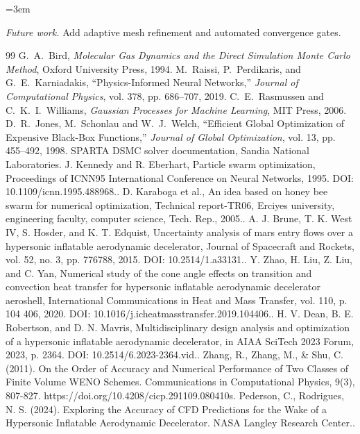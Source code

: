 \documentclass[conference]{IEEEtran}
\begin{document}
\begin{sloppypar} \emergencystretch=3em \raggedright
\noindent\textit{Future work.} Add adaptive mesh refinement and automated convergence gates.\par\vspace{0.3em}
\begin{thebibliography}{99}
 G.~A.~Bird, \emph{Molecular Gas Dynamics and the Direct Simulation Monte Carlo Method}, Oxford University Press, 1994.
 M.~Raissi, P.~Perdikaris, and G.~E.~Karniadakis, ``Physics-Informed Neural Networks,'' \emph{Journal of Computational Physics}, vol. 378, pp. 686--707, 2019.
 C.~E.~Rasmussen and C.~K.~I.~Williams, \emph{Gaussian Processes for Machine Learning}, MIT Press, 2006.
 D.~R.~Jones, M.~Schonlau and W.~J.~Welch, ``Efficient Global Optimization of Expensive Black-Box Functions,'' \emph{Journal of Global Optimization}, vol. 13, pp. 455--492, 1998.
 SPARTA DSMC solver documentation, Sandia National Laboratories.
 J. Kennedy and R. Eberhart, Particle swarm optimization, Proceedings of ICNN95 International Conference on Neural Networks, 1995. DOI: 10.1109/icnn.1995.488968..
 D. Karaboga et al., An idea based on honey bee swarm for numerical optimization, Technical report-TR06, Erciyes university, engineering faculty, computer science, Tech. Rep., 2005..
 A. J. Brune, T. K. West IV, S. Hosder, and K. T. Edquist, Uncertainty analysis of mars entry flows over a hypersonic inflatable aerodynamic decelerator, Journal of Spacecraft and Rockets, vol. 52, no. 3, pp. 776788, 2015. DOI: 10.2514/1.a33131..
 Y. Zhao, H. Liu, Z. Liu, and C. Yan, Numerical study of the cone angle effects on transition and convection heat transfer for hypersonic inflatable aerodynamic decelerator aeroshell, International Communications in Heat and Mass Transfer, vol. 110, p. 104 406, 2020. DOI: 10.1016/j.icheatmasstransfer.2019.104406..
 H. V. Dean, B. E. Robertson, and D. N. Mavris, Multidisciplinary design analysis and optimization of a hypersonic inflatable aerodynamic decelerator, in AIAA SciTech 2023 Forum, 2023, p. 2364. DOI: 10.2514/6.2023-2364.vid..
 Zhang, R., Zhang, M., \& Shu, C. (2011). On the Order of Accuracy and Numerical Performance of Two Classes of Finite Volume WENO Schemes. Communications in Computational Physics, 9(3), 807-827. https://doi.org/10.4208/cicp.291109.080410s.
 Pederson, C., Rodrigues, N. S. (2024). Exploring the Accuracy of CFD Predictions for the Wake of a Hypersonic Inflatable Aerodynamic Decelerator. NASA Langley Research Center..

\end{thebibliography}
\end{sloppypar}
\end{document}
